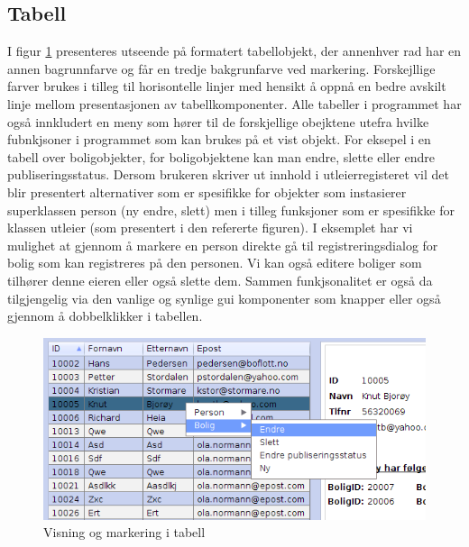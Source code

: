 \subsection{Tabell}
I figur \ref{fig:tabell} presenteres utseende på formatert tabellobjekt, der annenhver rad har en annen bagrunnfarve og får en tredje bakgrunfarve ved markering. Forskejllige farver brukes i tilleg til horisontelle linjer med hensikt å oppnå en bedre avskilt linje mellom presentasjonen av tabellkomponenter. Alle tabeller i programmet har også innkludert en meny som hører til de forskjellige obejktene utefra hvilke fubnkjsoner i programmet som kan brukes på et vist objekt. For eksepel i en tabell over boligobjekter, for boligobjektene kan man endre, slette eller endre publiseringsstatus. Dersom brukeren skriver ut innhold i utleierregisteret vil det blir presentert alternativer som er spesifikke for objekter som instasierer superklassen person (ny endre, slett) men i tilleg funksjoner som er spesifikke for klassen utleier (som presentert i den refererte figuren). I eksemplet har vi mulighet at gjennom å markere en person direkte gå til registreringsdialog for bolig som kan registreres på den personen. Vi kan også editere boliger som tilhører denne eieren eller også slette dem. Sammen funkjsonalitet er også da tilgjengelig via den vanlige og synlige gui komponenter som knapper eller også gjennom å dobbelklikker i tabellen.

\begin{figure}[ht!]
\center
 \includegraphics[scale=0.7]{./img/produktdokumentasjon/visuelle_detaljer/tabell.png}
 \caption{Visning og markering i tabell}
 \label{fig:tabell}
\end{figure}

